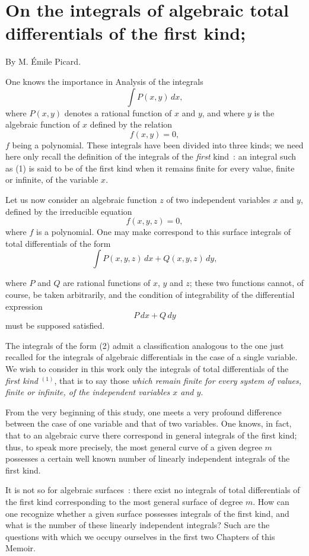\documentclass{article}
\begin{document}

\section*{On the integrals of algebraic total differentials of the first kind;}

By M. Émile Picard.

One knows the importance in Analysis of the integrals
\[
\int P(x, y)\,dx,
\tag{1}
\]
where $P(x, y)$ denotes a rational function of $x$ and $y$, and where $y$ is the algebraic function of $x$ defined by the relation
\[
f(x, y) = 0,
\]
$f$ being a polynomial. These integrals have been divided into three kinds; we need here only recall the definition of the integrals of the \emph{first} kind~: an integral such as (1) is said to be of the first kind when it remains finite for every value, finite or infinite, of the variable $x$.

Let us now consider an algebraic function $z$ of two independent variables $x$ and $y$, defined by the irreducible equation
\[
f(x, y, z) = 0,
\]
where $f$ is a polynomial. One may make correspond to this surface integrals of total differentials of the form
\[
\int P(x, y, z)\,dx + Q(x, y, z)\,dy,
\tag{2}
\]


where $P$ and $Q$ are rational functions of $x$, $y$ and $z$; these two functions cannot, of course, be taken arbitrarily, and the condition of integrability of the differential expression
\[
P\,dx + Q\,dy
\]
must be supposed satisfied.

The integrals of the form (2) admit a classification analogous to the one just recalled for the integrals of algebraic differentials in the case of a single variable. We wish to consider in this work only the integrals of total differentials of the \emph{first kind} ${}^{(1)}$, that is to say those \emph{which remain finite for every system of values, finite or infinite, of the independent variables $x$ and $y$}.

From the very beginning of this study, one meets a very profound difference between the case of one variable and that of two variables. One knows, in fact, that to an algebraic curve there correspond in general integrals of the first kind; thus, to speak more precisely, the most general curve of a given degree $m$ possesses a certain well known number of linearly independent integrals of the first kind.

It is not so for algebraic surfaces~: there exist no integrals of total differentials of the first kind corresponding to the most general surface of degree $m$. How can one recognize whether a given surface possesses integrals of the first kind, and what is the number of these linearly independent integrals? Such are the questions with which we occupy ourselves in the first two Chapters of this Memoir.
\end{document}
